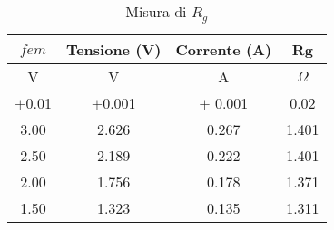    \begin{table}[H]
    \centering
    \caption{Misura di $R_g$}
    \begin{tabular}{|c|c|c|c|}
    \hline
        $fem$ & Tensione (V) & Corrente (A) & Rg \\ \hline
        V & V & A & $\Omega$ \\ \hline
        $\pm$0.01 & $\pm$0.001 & $\pm$ 0.001 & 0.02 \\ \hline
        3.00 & 2.626 & 0.267 & 1.401 \\ 
        2.50 & 2.189 & 0.222 & 1.401 \\ 
        2.00 & 1.756 & 0.178 & 1.371 \\ 
        1.50 & 1.323 & 0.135 & 1.311 \\ \hline
    \end{tabular}
    \label{}
    \end{table}
